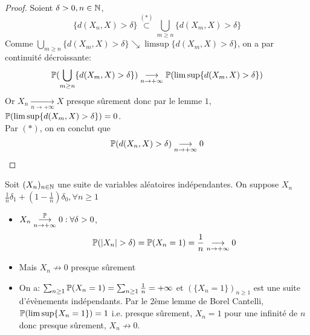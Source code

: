 \documentclass[]{report}
\begin{document}
    \begin{proof}
        Soient $\delta>0,n\in \mathbb{N}$,
        \[\{d(X_n,X)>\delta\}\overset{(*)}{\subset} \bigcup_{m\ge n}\{d(X_m,X)>\delta\}\]
        Comme $\bigcup_{m\ge n}\{d(X_m,X)>\delta\}\searrow\limsup \{d(X_m,X)>\delta\}$, on a par continuité décroissante:
        \[\mathbb{P}(\bigcup_{m\ge n}\{d(X_m,X)>\delta\})\underset{n\to +\infty}{\longrightarrow} \mathbb{P}(\limsup \{d(X_m,X)>\delta\})\]
        Or $X_n\underset{n\to +\infty}{\longrightarrow}X$ presque sûrement donc par le lemme $1$, $\mathbb{P}(\limsup \{d(X_m,X)>\delta\})=0$.\\
        Par $(*)$, on en conclut que
        \[\mathbb{P}(d(X_n,X)>\delta)\underset{n\to+\infty}{\longrightarrow} 0\]
    \end{proof}

    \begin{ex}{}{}
        Soit $(X_n)_{n\in\mathbb{N}}$ une suite de variables aléatoires indépendantes. On suppose $X_n$~ $\frac{1}{n}\delta_1+(1-\frac{1}{n})\delta_0,\forall n\ge 1$\\
        \begin{itemize}
            \item $X_n\overunderset{\Pa}{n\to +\infty}{\longrightarrow}0:\forall \delta >0$,\\
            \[\Pa(|X_n|>\delta)=\Pa(X_n=1)=\frac{1}{n}\underset{n\to +\infty}{\longrightarrow}0\]
            \item Mais $X_n\not\to 0$ presque sûrement
            \item On a: $\sum_{n\ge 1}\mathbb{P}(X_n=1)=\sum_{n\ge 1}\frac{1}{n}=+\infty$ et $(\{X_n=1\})_{n\ge 1}$ est une suite d'évènements indépendants. Par le 2ème lemme de Borel Cantelli, $\mathbb{P}(\limsup \{X_n=1\})=1$ i.e. presque sûrement, $X_n=1$ pour une infinité de $n$ donc presque sûrement, $X_n\not\to 0$.
        \end{itemize}
    \end{ex}
\end{document}
